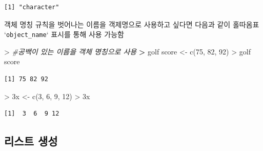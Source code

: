 \documentclass[
  11pt,
]{krantz}
\makeatletter
\newenvironment{Shaded}{\begin{snugshade}}{\end{snugshade}}
\newcommand{\AttributeTok}[1]{\textcolor[rgb]{0.61,0.61,0.61}{#1}}
\newcommand{\CommentTok}[1]{\textcolor[rgb]{0.37,0.37,0.37}{\textit{#1}}}
\newcommand{\DecValTok}[1]{\textcolor[rgb]{0.06,0.06,0.06}{#1}}
\newcommand{\ErrorTok}[1]{\textcolor[rgb]{0.14,0.14,0.14}{\textbf{#1}}}
\newcommand{\FunctionTok}[1]{\textcolor[rgb]{0,0,0}{#1}}
\newcommand{\NormalTok}[1]{#1}
\newcommand{\OtherTok}[1]{\textcolor[rgb]{0.37,0.37,0.37}{#1}}
\newcommand{\SpecialCharTok}[1]{\textcolor[rgb]{0,0,0}{#1}}
\newcommand{\StringTok}[1]{\textcolor[rgb]{0.5,0.5,0.5}{#1}}
\newenvironment{kframe}{%
\medskip{}
\setlength{\fboxsep}{.8em}
 \def\at@end@of@kframe{}%
 \ifinner\ifhmode%
  \def\at@end@of@kframe{\end{minipage}}%
  \begin{minipage}{\columnwidth}%
 \fi\fi%
 \def\FrameCommand##1{\hskip\@totalleftmargin \hskip-\fboxsep
 \colorbox{shadecolor}{##1}\hskip-\fboxsep
     \hskip-\linewidth \hskip-\@totalleftmargin \hskip\columnwidth}%
 \MakeFramed {\advance\hsize-\width
   \@totalleftmargin\z@ \linewidth\hsize
   \@setminipage}}%
 {\par\unskip\endMakeFramed%
 \at@end@of@kframe}
\newenvironment{rmdblock}[1]
  {
  \begin{itemize}
  \renewcommand{\labelitemi}{
    \raisebox{-.7\height}[0pt][0pt]{
      {\setkeys{Gin}{width=3em,keepaspectratio}\texttt{[image: images/\#1]}}
    }
  }
  \setlength{\fboxsep}{1em}
  \begin{kframe}
  \item
  }
  {
  \end{kframe}
  \end{itemize}
  }
\newenvironment{rmdtip}
  {\begin{rmdblock}{tip}}
  {\end{rmdblock}}
\makeatother
\begin{document}
\begin{verbatim}
[1] "character"
\end{verbatim}

\normalsize

\footnotesize

\begin{rmdtip}
객체 명칭 규칙을 벗어나는 이름을 객제명으로 사용하고 싶다면 다음과 같이 홀따옴표 `\texttt{object\_name}` 표시를 통해 사용 가능함
\end{rmdtip}

\normalsize

\footnotesize

\begin{Shaded}
\begin{Highlighting}[]
\SpecialCharTok{\textgreater{}} \CommentTok{\#공백이 있는 이름을 객체 명칭으로 사용}
\ErrorTok{\textgreater{}} \StringTok{\textasciigrave{}}\AttributeTok{golf score}\StringTok{\textasciigrave{}} \OtherTok{\textless{}{-}} \FunctionTok{c}\NormalTok{(}\DecValTok{75}\NormalTok{, }\DecValTok{82}\NormalTok{, }\DecValTok{92}\NormalTok{)}
\SpecialCharTok{\textgreater{}} \StringTok{\textasciigrave{}}\AttributeTok{golf score}\StringTok{\textasciigrave{}}
\end{Highlighting}
\end{Shaded}

\begin{verbatim}
[1] 75 82 92
\end{verbatim}

\begin{Shaded}
\begin{Highlighting}[]
\SpecialCharTok{\textgreater{}} \StringTok{\textasciigrave{}}\AttributeTok{3x}\StringTok{\textasciigrave{}} \OtherTok{\textless{}{-}} \FunctionTok{c}\NormalTok{(}\DecValTok{3}\NormalTok{, }\DecValTok{6}\NormalTok{, }\DecValTok{9}\NormalTok{, }\DecValTok{12}\NormalTok{)}
\SpecialCharTok{\textgreater{}} \StringTok{\textasciigrave{}}\AttributeTok{3x}\StringTok{\textasciigrave{}}
\end{Highlighting}
\end{Shaded}

\begin{verbatim}
[1]  3  6  9 12
\end{verbatim}

\normalsize

\hypertarget{make-list}{%
\subsection{리스트 생성}\label{make-list}}
\end{document}
